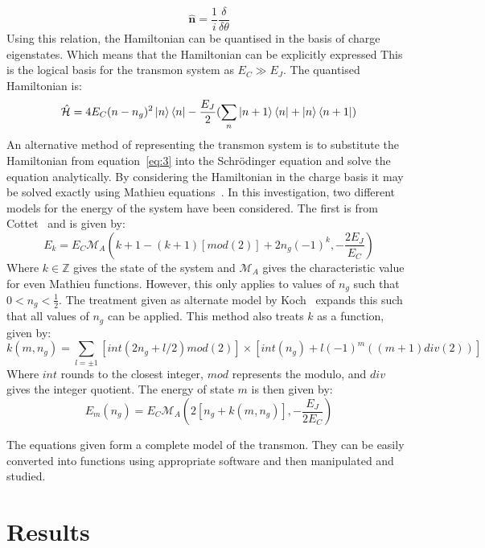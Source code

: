 \documentclass[11pt]{article}
\newcommand*{\hatH}{\hat{\mathcal{H}}}
\begin{document}
\begin{equation} \label{eq:5}
\boldsymbol{\hat{n}} = \frac{1}{i} \frac{\delta}{\delta\theta}
\end{equation}
Using this relation, the Hamiltonian can be quantised in the basis of charge eigenstates. Which means that the Hamiltonian can be explicitly expressed This is the logical basis for the transmon system as $E_C \gg E_J$. The quantised Hamiltonian is:
\begin{equation} \label{eq:6}
\hatH = 4E_C (n-n_g)^2 \ket{n}\bra{n} - \frac{E_J}{2}(\sum_{n} \ket{n+1}\bra{n} + \ket{n}\bra{n+1})
\end{equation}
An alternative method of representing the transmon system is to substitute the Hamiltonian from equation~\ref{eq:3} into the Schr\"odinger equation and solve the equation analytically.
By considering the Hamiltonian in the charge basis it may be solved exactly using Mathieu equations~\cite{rubyApplicationsMathieuEquation1996}. In this investigation, two different models for the energy of the system have been considered. The first is from Cottet~\cite{cottetImplementationQuantumBit2002} and is given by:
\begin{equation} \label{eq:7}
E_k = E_C \mathcal{M}_A (k+1 - (k+1)[mod(2)] + 2n_g(-1)^k, -\frac{2E_J}{E_C})
\end{equation}
Where $k \in \mathbb{Z}$ gives the state of the system and $\mathcal{M}_A$ gives the characteristic value for even Mathieu functions. However, this only applies to values of $n_g$ such that $0 < n_g < \frac{1}{2}$. The treatment given as alternate model by Koch~\cite{kochChargeinsensitiveQubitDesign2007} expands this such that all values of $n_g$ can be applied. This method also treats $k$ as a function, given by:
\begin{equation} \label{eq:8}
k(m, n_g) = \sum_{l=\pm 1} [int(2n_g + l/2)mod(2)] \times [int(n_g) + l(-1)^m ((m+1)div(2))]
\end{equation}
Where $int$ rounds to the closest integer, $mod$ represents the modulo, and $div$ gives the integer quotient. The energy of state $m$ is then given by:
\begin{equation} \label{eq:9}
E_m(n_g) = E_C \mathcal{M}_A (2[n_g + k(m,n_g)],-\frac{E_J}{2E_C})
\end{equation}

The equations given form a complete model of the transmon. They can be easily converted into functions using appropriate software and then manipulated and studied.

\section{Results}
\end{document}
